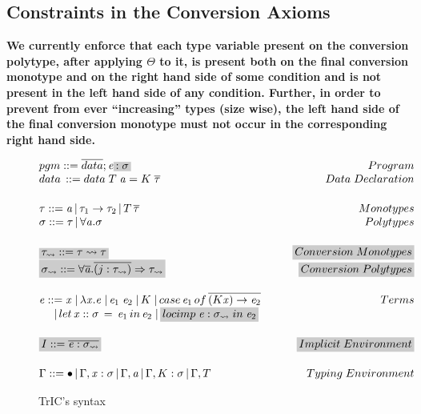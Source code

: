 \subsection{Constraints in the Conversion Axioms}
\label{constraints}
\textbf{We currently enforce that each type variable present on the conversion polytype, after applying $\Theta$ to it, is present both on the final conversion monotype and on the right hand side of some condition and is not present in the left hand side of any condition. Further, in order to prevent from ever ``increasing'' types (size wise), the left hand side of the final conversion monotype must not occur in the corresponding right hand side.}
\begin{figure}
   \[
\begin{array}{@{\hspace{0mm}}l@{\hspace{0mm}}}
  pgm ::= \overline{data};\term\highlight{:\typeS}\hfill Program\\
  data\,::= data\;T\;\tyVar=K\;\overline{\type}\hfill Data\;Declaration
  \\[5mm]
  \type ::= \tyVar\,|\,\type_1\to\type_2\,|\,T\,\overline{\type}\hfill Monotypes\\
  \typeS ::= \type\,|\,\forall\tyVar.\typeS\hfill Polytypes
  \\[5mm]
    \highlight{\type_{\rightsquigarrow} ::= \type \rightsquigarrow \type}\hfill \highlight{Conversion\;Monotypes}\\
  \highlight{\typeS_{\rightsquigarrow} ::= \forall \overline {\tyVar} . \overline{(j : \type_{\rightsquigarrow})} \Rightarrow \type_{\rightsquigarrow}}\hfill \highlight{Conversion\;Polytypes}
  \\[5mm]
  \term ::= \tmVar\;|\,\lambda \tmVar.\term\;|\,\term_1 \; \term_2\;|\, K \;|\, case \, \term_1 \, of\, \overline{(K \tmVar) \rightarrow \term_2} \hfill Terms\\
  \phantom{\term ::}|\, let \, \tmVar ::\typeS\, =\, \term_1 \,in\, \term_2  \;|\,\highlight{ locimp \; \term : \typeS_{\rightsquigarrow}\; in\; \term_2}
  \\[5mm]
  \highlight{\imEnv::=\overline{\term : \typeS_{\rightsquigarrow}}} \hfill \highlight{Implicit\;Environment}
  \\[5mm]
  \tyEnv::=\bullet\,|\,\tyEnv,\tmVar:\typeS\,|\,\tyEnv,\tyVar\,|\,\tyEnv,K:\typeS\,|\,\tyEnv,T \hfill \phantom{xxxxxxxxxxxxxxx} Typing\; Environment

  \end{array}
\]
  \caption{TrIC's syntax}
  \label{mlsyntax}
\end{figure}

